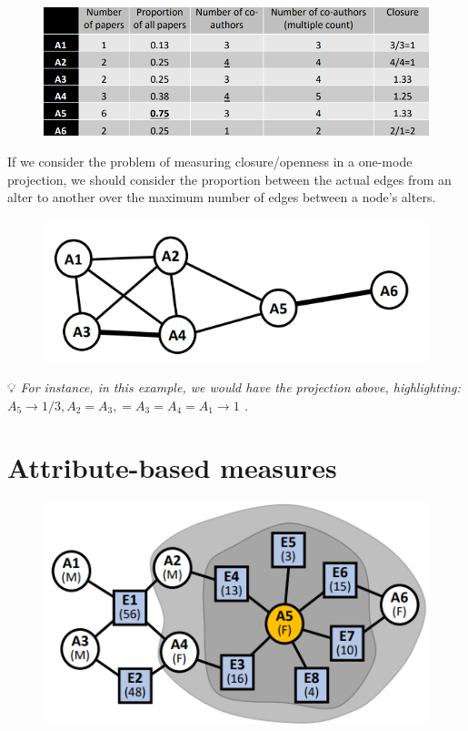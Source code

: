 \documentclass[
  notitlepage,
  onecolumn,
  openany]{book}
\begin{document}
\begin{figure}[h!]

{\centering \includegraphics[width=0.5\linewidth]{images/10-Two mode networks/Untitled 10} 

}

\end{figure}

If we consider the problem of measuring closure/openness in a one-mode projection, we should consider the proportion between the actual edges from an alter to another over the maximum number of edges between a node's alters.

\begin{figure}[h!]

{\centering \includegraphics[width=0.5\linewidth]{images/10-Two mode networks/Untitled 11} 

}

\end{figure}

💡 \emph{For instance, in this example, we would have the projection above, highlighting:
\(A_5 \rightarrow 1/3, A_2=A_3, =A_3=A_4= A_1\rightarrow 1\) .}

\hypertarget{attribute-based-measures}{%
\section{Attribute-based measures}\label{attribute-based-measures}}

\begin{figure}[h!]

{\centering \includegraphics[width=0.4\linewidth]{images/10-Two mode networks/Untitled 12} 

}

\end{figure}
\end{document}

